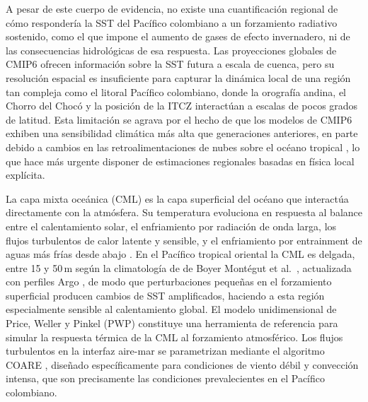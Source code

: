 \documentclass[12pt, a4paper]{article}
\begin{document}
A pesar de este cuerpo de evidencia, no existe una cuantificaci\'on regional de c\'omo 
responder\'ia la SST del Pac\'ifico colombiano a un forzamiento radiativo sostenido, como 
el que impone el aumento de gases de efecto invernadero, ni de las consecuencias 
hidrol\'ogicas de esa respuesta. Las proyecciones globales de CMIP6 \cite{Eyring2016} 
ofrecen informaci\'on sobre la SST futura a escala de cuenca, pero su resoluci\'on espacial 
es insuficiente para capturar la din\'amica local de una regi\'on tan compleja como el 
litoral Pac\'ifico colombiano, donde la orograf\'ia andina, el Chorro del Choc\'o y la 
posici\'on de la ITCZ interact\'uan a escalas de pocos grados de latitud. Esta limitaci\'on 
se agrava por el hecho de que los modelos de CMIP6 exhiben una sensibilidad clim\'atica 
m\'as alta que generaciones anteriores, en parte debido a cambios en las 
retroalimentaciones de nubes sobre el oc\'eano tropical \cite{Zelinka2020}, lo que hace 
m\'as urgente disponer de estimaciones regionales basadas en f\'isica local expl\'icita.

La capa mixta oce\'anica (CML) es la capa superficial del oc\'eano que interact\'ua 
directamente con la atm\'osfera. Su temperatura evoluciona en respuesta al balance entre 
el calentamiento solar, el enfriamiento por radiaci\'on de onda larga, los flujos 
turbulentos de calor latente y sensible, y el enfriamiento por entrainment de aguas m\'as 
fr\'ias desde abajo \cite{SwensonHansen1999}. En el Pac\'ifico tropical oriental la CML es 
delgada, entre 15 y 50\,m seg\'un la climatolog\'ia de de Boyer Mont\'egut et al.\ 
\cite{deBoyer2004}, actualizada con perfiles Argo \cite{deBoyer2024}, de modo que 
perturbaciones peque\~nas en el forzamiento superficial producen cambios de SST 
amplificados, haciendo a esta regi\'on especialmente sensible al calentamiento global. El 
modelo unidimensional de Price, Weller y Pinkel (PWP) \cite{Price1986} constituye una 
herramienta de referencia para simular la respuesta t\'ermica de la CML al forzamiento 
atmosf\'erico. Los flujos turbulentos en la interfaz aire-mar se parametrizan mediante el 
algoritmo COARE \cite{Fairall1996, Fairall2003}, dise\~nado espec\'ificamente para 
condiciones de viento d\'ebil y convecci\'on intensa, que son precisamente las condiciones 
prevalecientes en el Pac\'ifico colombiano.
\end{document}
